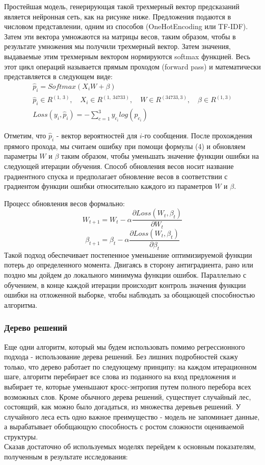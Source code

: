 \documentclass{article}
\begin{document}
Простейшая модель, генерирующая такой трехмерный вектор предсказаний является нейронная сеть, как на рисунке ниже. Предложения подаются в числовом представлении, одним из способов (OneHotEncoding или TF-IDF). Затем эти вектора умножаются на матрицы весов, таким образом, чтобы в результате умножения мы получили трехмерный вектор. Затем значения, выдаваемые этим трехмерным вектором нормируются softmax функцией. Весь этот цикл операций называется прямым проходом (forward pass) и математически представляется в следующем виде:
\begin{gather}
	\hat{p}_i = Softmax(X_iW + \beta) \\
	\hat{p}_i \in R^{(1, ~3)}, \quad X_i \in R^{(1, ~34733)} , \quad W \in R^{(34733, 3)}, \quad \beta\in R^{(1, 3)}\\
	Loss(y_i, \hat{p}_i) = -\sum_{c=1}^{3} y_{c_i} log(\hat{p}_{c_i})
\end{gather}

Отметим, что $\hat{p}_i$ - вектор вероятностей для $i$-го сообщения. После прохождения прямого прохода, мы считаем ошибку при помощи формулы (4) и обновляем параметры $W$ и $\beta$ таким образом, чтобы уменьшать значение функции ошибки на следующей итерации обучения. Способ обновления весов носит название градиентного спуска и предполагает обновление весов в соответствии с градиентом функции ошибки относительно каждого из параметров $W$ и $\beta$.

Процесс обновления весов формально:
\[ W_{t+1} = W_{t} - \alpha \frac{\partial Loss(W_t, \beta_t)}{\partial W_t} \]
\[ \beta_{t+1} = \beta_{t} - \alpha \frac{\partial Loss(W_t, \beta_t)}{\partial \beta_t} \]
 Такой подход обеспечивает постепенное уменьшение оптимизируемой функции потерь до определенного момента. Двигаясь в сторону антиградиента, рано или поздно мы дойдем до локального минимума функции ошибок. Параллельно с обучением, в конце каждой итерации происходит контроль значения функции ошибки на отложенной выборке, чтобы наблюдать за обощающей способностью алгоритма. 

 \subsubsection*{Дерево решений}
Еще одни алгоритм, который мы будем использовать помимо регрессионного подхода - использование дерева решений. Без лишних подробностей скажу только, что дерево работает по следующему принципу: на каждом итерационном шаге, алгоритм перебирает все слова из поданного на вход предложения и выбирает те, которые уменьшают кросс-энтропия путем полного перебора всех возможных слов. Кроме обычного дерева решений, существует случайный лес, состоящий, как можно было догадаться, из множества деревьев решений. У случайного леса есть одно важное преимущество - модель не запоминает данные, а вырабатывает обобщающую способность с ростом сложности оцениваемой структуры. \\ 
Сказав достаточно об используемых моделях перейдем к основным показателям, полученным в результате исследования:
\end{document}
